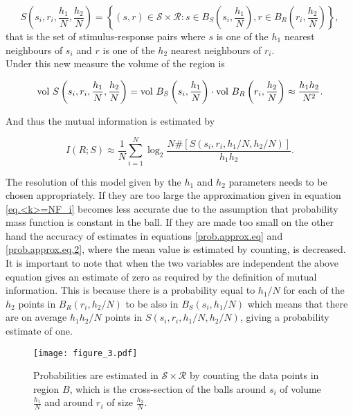 \documentclass[12pt]{extarticle}
\begin{document}
\begin{equation}
S\left( s_i, r_i, \frac{h_1}{N}, \frac{h_2}{N} \right) = \left\{ (s,r) \in \mathcal{S} \times \mathcal{R} : s \in B_S\left(s_i, \frac{h_1}{N}\right), r \in B_R\left(r_i, \frac{h_2}{N}\right)\right\},
\end{equation}
that is the set of stimulus-response pairs where $s$ is one of the
$h_1$ nearest neighbours of $s_i$ and $r$ is one of the $h_2$ nearest
neighbours of $r_i$.\\

\noindent
Under this new measure the volume of the region is

\begin{equation}
\textnormal{vol } S\left( s_i, r_i, \frac{h_1}{N}, \frac{h_2}{N} \right) = \textnormal{vol } B_S\left(s_i, \frac{h_1}{N}\right) \cdot \textnormal{vol }B_R\left(r_i, \frac{h_2}{N}\right) \approx \frac{h_1h_2}{N^2}.
\end{equation}

\noindent
And thus the mutual information is estimated by

\begin{equation}
I(R;S) \approx \frac{1}{N} \sum_{i=1}^{N} \log_2 \frac{N\#[S(s_i,r_i, h_1/N,h_2/N)]}{h_1h_2}.
\label{eq.MI.2x.metric}
\end{equation}

\noindent
The resolution of this model given by the $h_1$ and $h_2$ parameters
needs to be chosen appropriately. If they are too large the
approximation given in equation \ref{eq.<k>=NF_i} becomes less accurate due to the
assumption that probability mass function is constant in the ball. If
they are made too small on the other hand the accuracy of estimates in
equations \ref{prob.approx.eq} and \ref{prob.approx.eq.2}, where the mean value is estimated by
counting, is decreased.\\

\noindent
It is important to note that when the two variables are independent
the above equation gives an estimate of zero as required by the
definition of mutual information. This is because there is a
probability equal to $h_1/N$ for each of the $h_2$ points in $B_R(r_i,
h_2/N)$ to be also in $B_S(s_i, h_1/N)$ which means that there are on
average $h_1h_2/N$ points in $S(s_i,r_i,h_1/N,h_2/N)$, giving a
probability estimate of one.\\

\begin{figure}[H]
	\centering
	\texttt{[image: figure\_3.pdf]}
    \caption{Probabilities are estimated in $\mathcal{S}\times\mathcal{R}$ by counting the data points in region $B$, which is the cross-section of the balls around $s_i$ of volume $\frac{h_1}{N}$ and around $r_i$ of size $\frac{h_2}{N}$.}
\end{figure}
\end{document}
